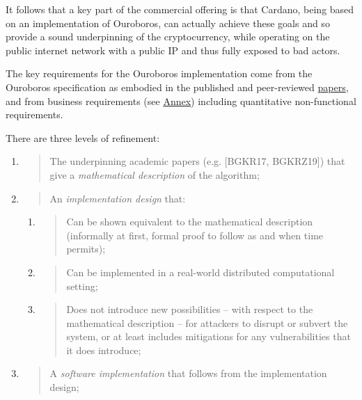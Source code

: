 \documentclass[11pt,a4paper]{article}
\begin{document}
It follows that a key part of the commercial offering is that Cardano,
being based on an implementation of Ouroboros, can actually achieve
these goals and so provide a sound underpinning of the cryptocurrency,
while operating on the public internet network with a public IP and thus
fully exposed to bad actors.

The key requirements for the Ouroboros implementation come from the
Ouroboros specification as embodied in the published and peer-reviewed
\href{https://iohk.io/research/papers/}{{papers}}, and from business
requirements (see \protect\hyperlink{business-requirements}{{Annex}})
including quantitative non-functional requirements.

There are three levels of refinement:

\begin{enumerate}
\def\labelenumi{\arabic{enumi}.}
\item
  \begin{quote}
  The underpinning academic papers (e.g. {[}BGKR17, BGKRZ19{]}) that
  give a \emph{mathematical description} of the algorithm;
  \end{quote}
\item
  \begin{quote}
  An \emph{implementation design} that:
  \end{quote}

  \begin{enumerate}
  \def\labelenumii{\alph{enumii}.}
  \item
    \begin{quote}
    Can be shown equivalent to the mathematical description (informally
    at first, formal proof to follow as and when time permits);
    \end{quote}
  \item
    \begin{quote}
    Can be implemented in a real-world distributed computational
    setting;
    \end{quote}
  \item
    \begin{quote}
    Does not introduce new possibilities -- with respect to the
    mathematical description -- for attackers to disrupt or subvert the
    system, or at least includes mitigations for any vulnerabilities
    that it does introduce;
    \end{quote}
  \end{enumerate}
\item
  \begin{quote}
  A \emph{software implementation} that follows from the implementation
  design;
  \end{quote}


\end{enumerate}
\end{document}

